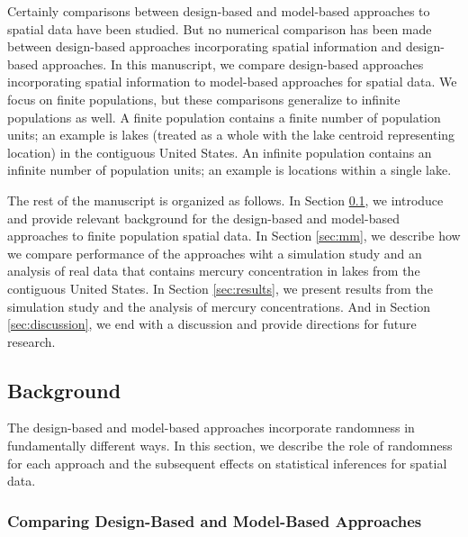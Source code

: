 \documentclass[]{elsarticle} %
\begin{document}
Certainly comparisons between design-based and model-based approaches to
spatial data have been studied. But no numerical comparison has been
made between design-based approaches incorporating spatial information
and design-based approaches. In this manuscript, we compare design-based
approaches incorporating spatial information to model-based approaches
for spatial data. We focus on finite populations, but these comparisons
generalize to infinite populations as well. A finite population contains
a finite number of population units; an example is lakes (treated as a
whole with the lake centroid representing location) in the contiguous
United States. An infinite population contains an infinite number of
population units; an example is locations within a single lake.

The rest of the manuscript is organized as follows. In Section
\ref{sec:background}, we introduce and provide relevant background for
the design-based and model-based approaches to finite population spatial
data. In Section \ref{sec:mm}, we describe how we compare performance of
the approaches wiht a simulation study and an analysis of real data that
contains mercury concentration in lakes from the contiguous United
States. In Section \ref{sec:results}, we present results from the
simulation study and the analysis of mercury concentrations. And in
Section \ref{sec:discussion}, we end with a discussion and provide
directions for future research.

\hypertarget{sec:background}{%
\subsection{Background}\label{sec:background}}

The design-based and model-based approaches incorporate randomness in
fundamentally different ways. In this section, we describe the role of
randomness for each approach and the subsequent effects on statistical
inferences for spatial data.

\hypertarget{subsec:dvm_compare}{%
\subsubsection{Comparing Design-Based and Model-Based
Approaches}\label{subsec:dvm_compare}}
\end{document}
